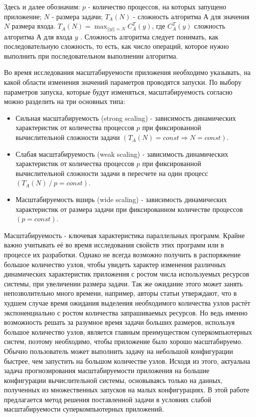 	Здесь и далее обозначим: \(p\) - количество процессов, на которых запущено приложение; \(N\) - размера задачи; \(T_A(N)\) - сложность алгоритма \(А\) для значения \(N\) размера входа. \(T_A(N) = \max_{||y|| = N} C^T_A(y)\), где \(C^T_A(y)\) сложность алгоритма \(А\) для входа \(y\) \cite{COMPLEXITY}. Сложность алгоритма следует понимать, как последовательную сложность, то есть, как число операций, которое нужно выполнить при последовательном выполнении алгоритма.

	Во время исследования масштабируемости приложения необходимо указывать, на какой области изменения значений параметров проводятся запуски. По выбору параметров запуска, которые будут изменяться, масштабируемость согласно \cite{scaling_types} можно разделить на три основных типа:
	\begin{itemize}
		\item Сильная масштабируемость (strong scaling) - зависимость динамических характеристик от количества процессов \(p\) при фиксированной вычислительной сложности задачи \((T_A(N) = const \Rightarrow N = const)\).
		\item Слабая масштабируемость (weak scaling) - зависимость динамических характеристик от количества процессов \(p\) при фиксированной вычислительной сложности задачи в пересчете на один процесс \((T_A(N)\:/\:p = const)\).
		\item Масштабируемость вширь (wide scaling) - зависимость динамических характеристик от размера задачи при фиксированном количестве процессов \((p = const)\).
	\end{itemize}

	Масштабируемость - ключевая характеристика параллельных программ. Крайне важно учитывать её во время исследования свойств этих программ или в процессе их разработки.
	Однако не всегда возможно получить в распоряжение большое количество узлов, чтобы увидеть характер изменения различных динамических характеристик приложения с ростом числа используемых ресурсов системы, при увеличении размера задачи. Так же ожидание этого может занять непозволительно много времени, например, авторы статьи \cite{log_main} утверждают, что в худшем случае время ожидания выделения необходимого количества узлов растёт экспоненциально с ростом количества запрашиваемых ресурсов. Но ведь именно возможность решать за разумное время задачи больших размеров, используя большое количество узлов, является главным преимуществом суперкомпьютерных систем, поэтому необходимо, чтобы приложение было хорошо масштабируемо. Обычно пользователь может выполнить задачу на небольшой конфигурации быстрее, чем запустить на большом количестве узлов. Исходя из этого, актуальна задача прогнозирования масштабируемости приложения на большие конфигурации вычислительной системы, основываясь только на данных, полученных из множественных запусков на малых конфигурациях.
	В этой работе предлагается метод решения поставленной задачи в условиях слабой масштабируемости суперкомпьютерных приложений.

\clearpage
